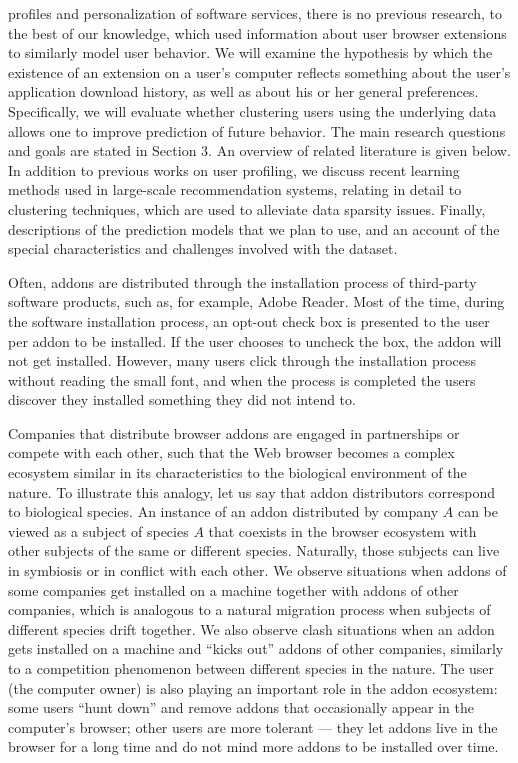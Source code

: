 \documentclass[11pt,oneside]{book}
\begin{document}
profiles and personalization of software services, there is no previous research, to the best of our knowledge, which used information about user browser extensions to similarly model user behavior. We will examine the hypothesis by which the existence of an extension on a user’s computer reflects something about the user's
application download history, as well as about his or her general preferences. Specifically, we will evaluate whether clustering users using the underlying data allows one to improve prediction of future behavior. The main research questions and goals are stated in Section 3. An overview of related literature is given below. In addition to previous works on user profiling, we discuss recent learning methods used in large-scale recommendation systems, relating in detail to clustering techniques, which are used to alleviate data sparsity
issues. Finally, descriptions of the prediction models that we plan to use, and an account of the special characteristics and challenges involved with the dataset.
\fi

Often, addons are distributed through the installation process of third-party software products, such as, for example, Adobe Reader. Most of the time, during the software installation process, an opt-out check box is presented to the user per addon to be installed. If the user chooses to uncheck the box, the addon will not get installed. However, many users click through the installation process without reading the small font, and when the process is completed the users discover they installed something they did not intend to. 

Companies that distribute browser addons are engaged in partnerships or compete with each other, such that the Web browser becomes a complex ecosystem similar in its characteristics to the biological environment of the nature. To illustrate this analogy, let us say that addon distributors correspond to biological species. An instance of an addon distributed by company $A$ can be viewed as a subject of species $A$ that coexists in the browser ecosystem with other subjects of the same or different species. Naturally, those subjects can live in symbiosis or in conflict with each other. We observe situations when addons of some companies get installed on a machine together with addons of other companies, which is analogous to a natural migration process when subjects of different species drift together. We also observe clash situations when an addon gets installed on a machine and ``kicks out'' addons of other companies, similarly to a competition phenomenon between different species in the nature. The user (the computer owner) is also playing an important role in the addon ecosystem: some users ``hunt down'' and remove addons that occasionally appear in the computer's browser; other users are more tolerant --- they let addons live in the browser for a long time and do not mind more addons to be installed over time.
\end{document}
